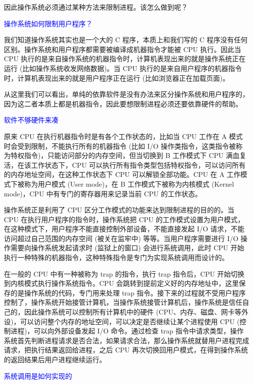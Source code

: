 \documentclass[utf8]{book}
\begin{document}
	因此操作系统必须通过某种方法来限制进程。该怎么做到呢？
	
	\textcolor{blue}{操作系统如何限制用户程序？}
	
	我们知道操作系统其实也是一个大的 C 程序，本质上和我们写的 C 程序没有任何区别。操作系统和用户程序都需要被编译成机器指令才能被 CPU 执行。因此当 CPU 执行的是来自操作系统的机器指令时，计算机表现出来的就是操作系统正在运行 (比如操作系统收发网络数据)。当 CPU 执行的是来自用户程序的机器指令时，计算机表现出来的就是用户程序正在运行 (比如浏览器正在加载页面)。
	
	从这里我们可以看出，单纯的依靠软件是没有办法来区分操作系统和用户程序的，因为这二者本质上都是机器指令，因此要想限制进程必须还要依靠硬件的帮助。
	
	
	\textcolor{blue}{软件不够硬件来凑}
	
	原来 CPU 在执行机器指令时是有各个工作状态的，比如当 CPU 工作在 A 模式时会受到限制，不能执行所有的机器指令 (比如 I/O 操作类指令，这类指令被称为特权指令)，只能访问部分的内存空间，但当切换到 B 工作模式下 CPU 满血复活，在该工作状态下，CPU 可以执行所有指令类型包括特权指令，可以访问所有的内存地址空间，在这种工作状态下 CPU 可以解锁全部功能。CPU 在 A 工作模式下被称为用户模式 (User mode)，在 B 工作模式下被称为内核模式 (Kernel mode)，CPU 中有专门的寄存器用来记录当前 CPU 的工作状态。
	
	操作系统正是利用了 CPU 区分工作模式的功能来达到限制进程的目的的。当 CPU 在执行用户程序的指令时，操作系统把 CPU 的工作模式设置为用户模式，在这种模式下，用户程序不能直接控制外部设备，不能直接发起 I/O 请求，不能访问超过自己范围的内存空间 (被关在监牢中) 等等。当用户程序需要进行 I/O 操作需要向操作系统发起请求时 (监狱上的窗口) 会进行系统调用，此时 CPU 开始执行一种特殊的机器指令，这种特殊指令是专门为实现系统调用而设计的。
	
	在一般的 CPU 中有一种被称为 trap 的指令，执行 trap 指令后，CPU 开始切换到内核模式执行操作系统指令。CPU 会跳转到提前定义好的内存地址中，这里保存的是操作系统的代码，专门用来处理 trap 指令。接下来的过程就不受用户程序控制了，操作系统开始接管计算机，当操作系统接管计算机后，操作系统是信任自己的，因此操作系统可以控制所有计算机中的硬件 (CPU、内存、磁盘、网卡等外设)，可以访问整个内存的地址空间，可以决定是否继续让某个进程使用 CPU (控制进程)，可以向外部设备发起 I/O 命令。通过检查 trap 指令中请求类型，操作系统首先判断进程请求是否合法，如果请求合法，那么操作系统就替用户进程完成请求，把执行结果返回给进程，之后 CPU 再次切换回用户模式，在得到操作系统的返回结果后用户进程继续运行。
	
	\textcolor{blue}{系统调用是如何实现的}
	
\end{document}
